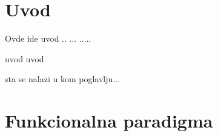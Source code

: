 \documentclass[12pt,oneside]{memoir}
\begin{document}
\frontmatter
\naslovna
\komisija
\apstrakt
\tableofcontents*

\mainmatter

\chapter{Uvod}
\par
Ovde ide uvod .. ... ..... 
\par uvod uvod

\par sta se nalazi u kom poglavlju...


\chapter{Funkcionalna paradigma}
\label{chp:uvodnideo}
\end{document}
